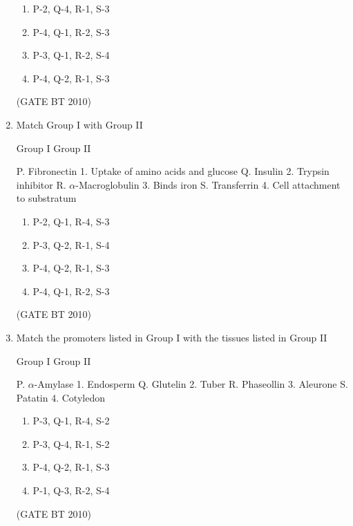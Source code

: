 \documentclass[journal,12pt,onecolumn]{IEEEtran}
\theoremstyle{remark}
\begin{document}
\begin{enumerate}
\begin{enumerate}
   \item P-2, Q-4, R-1, S-3  
   \item P-4, Q-1, R-2, S-3  
   \item P-3, Q-1, R-2, S-4  
   \item P-4, Q-2, R-1, S-3  
\end{enumerate}
\hfill (GATE BT 2010)


\item Match Group I with Group II  

Group I \hspace{3cm} Group II  

P. Fibronectin \hspace{2.7cm} 1. Uptake of amino acids and glucose  
Q. Insulin \hspace{3.7cm} 2. Trypsin inhibitor  
R. $\alpha$-Macroglobulin \hspace{1.6cm} 3. Binds iron  
S. Transferrin \hspace{3.2cm} 4. Cell attachment to substratum  

\begin{enumerate}
   \item P-2, Q-1, R-4, S-3  
   \item P-3, Q-2, R-1, S-4  
   \item P-4, Q-2, R-1, S-3  
   \item P-4, Q-1, R-2, S-3  
\end{enumerate}
\hfill (GATE BT 2010)

\item Match the promoters listed in Group I with the tissues listed in Group II  

Group I \hspace{3cm} Group II  

P. $\alpha$-Amylase \hspace{2.6cm} 1. Endosperm  
Q. Glutelin \hspace{3.6cm} 2. Tuber  
R. Phaseollin \hspace{3.1cm} 3. Aleurone  
S. Patatin \hspace{3.7cm} 4. Cotyledon  

\begin{enumerate}
   \item P-3, Q-1, R-4, S-2  
   \item P-3, Q-4, R-1, S-2  
   \item P-4, Q-2, R-1, S-3  
   \item P-1, Q-3, R-2, S-4  
\end{enumerate}
\hfill (GATE BT 2010)


\end{enumerate}
\end{document}

